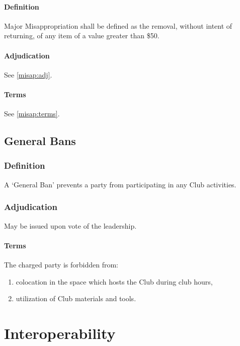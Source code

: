 \documentclass[12pt]{article}
\begin{document}
\paragraph{Definition}
Major Misappropriation shall be defined as the removal, without intent of returning,
of any item of a value greater than \$50.
\paragraph{Adjudication}
See \cref{misap:adj}.
\paragraph{Terms}
See \cref{misap:terms}.
\subsection{General Bans}
\label{citations:ban}
\subsubsection{Definition}
A `General Ban' prevents a party from participating in any Club activities.
\subsubsection{Adjudication}
May be issued upon vote of the leadership.
\paragraph{Terms}
The charged party is forbidden from: 
\begin{enumerate}[label=(\roman*)]
    \item colocation in the space which hosts the Club during club hours,
    \item utilization of Club materials and tools.
\end{enumerate}
\section{Interoperability}
\end{document}
